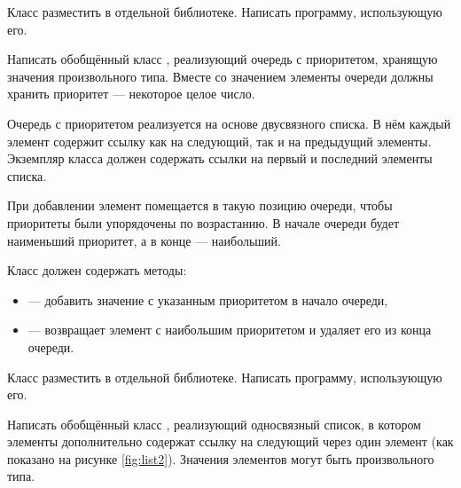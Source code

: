 Класс разместить в отдельной библиотеке. Написать программу,
использующую его.

\task Написать обобщённый класс , реализующий
очередь с приоритетом, хранящую значения
произвольного типа. Вместе со значением элементы очереди должны
хранить приоритет — некоторое целое число.

Очередь с приоритетом реализуется на основе двусвязного списка. В нём
каждый элемент содержит ссылку как на следующий, так и на предыдущий
элементы. Экземпляр класса должен содержать ссылки на первый и
последний элементы списка.

При добавлении элемент помещается в такую позицию очереди, чтобы
приоритеты были упорядочены по возрастанию. В начале очереди будет
наименьший приоритет, а в конце — наибольший.

Класс должен содержать методы:
\begin{itemize}
\item {} — добавить значение с указанным приоритетом в
  начало очереди,
\item {} — возвращает элемент с наибольшим приоритетом и
  удаляет его из конца очереди.
\end{itemize}

Класс разместить в отдельной библиотеке. Написать программу,
использующую его.

\task Написать обобщённый класс , реализующий
односвязный список, в котором элементы дополнительно содержат ссылку
на следующий через один элемент (как показано на рисунке
\ref{fig:list2}).  Значения элементов могут быть произвольного типа.


